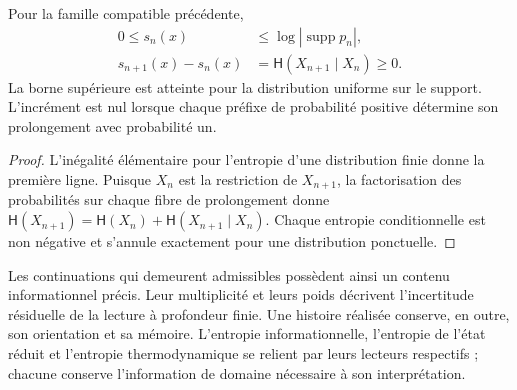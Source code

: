 \begin{proposition}
Pour la famille compatible précédente,
\begin{align}
 0\leq s_n(x)&\leq\log|\operatorname{supp}p_n|,\\
 s_{n+1}(x)-s_n(x)
 &=\mathsf H(X_{n+1}\mid X_n)\geq0.
 \label{eq:ii-entropia-refinamiento}
\end{align}
La borne supérieure est atteinte pour la distribution uniforme sur le
support. L'incrément est nul lorsque chaque préfixe de probabilité
positive détermine son prolongement avec probabilité un.
\end{proposition}
\begin{proof}
L'inégalité élémentaire pour l'entropie d'une distribution finie
donne la première ligne. Puisque \(X_n\) est la restriction de \(X_{n+1}\),
la factorisation des probabilités sur chaque fibre de prolongement
donne \(\mathsf H(X_{n+1})=\mathsf H(X_n)+
\mathsf H(X_{n+1}\mid X_n)\). Chaque entropie conditionnelle est non
négative et s'annule exactement pour une distribution ponctuelle.
\end{proof}

Les continuations qui demeurent admissibles possèdent ainsi un contenu
informationnel précis. Leur multiplicité et leurs poids décrivent
l'incertitude résiduelle de la lecture à profondeur finie. Une
histoire réalisée conserve, en outre, son orientation et sa mémoire.
L'entropie informationnelle, l'entropie de l'état réduit et l'entropie
thermodynamique se relient par leurs lecteurs respectifs ; chacune
conserve l'information de domaine nécessaire à son interprétation.
